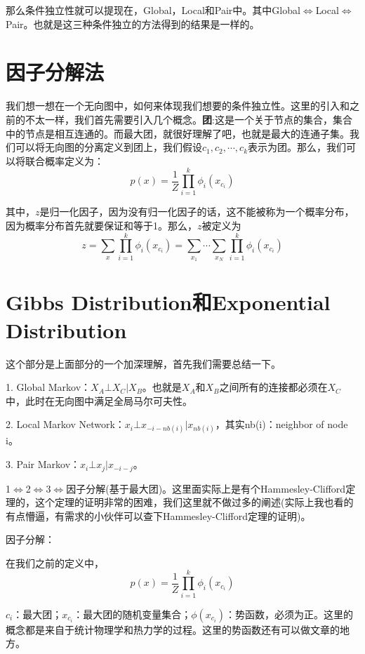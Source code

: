 \documentclass[a4paper]{article}
\begin{document}
那么条件独立性就可以提现在，Global，Local和Pair中。其中Global$\Leftrightarrow$Local$\Leftrightarrow$Pair。也就是这三种条件独立的方法得到的结果是一样的。

\section{因子分解法}
我们想一想在一个无向图中，如何来体现我们想要的条件独立性。这里的引入和之前的不太一样，我们首先需要引入几个概念。\textbf{团}:这是一个关于节点的集合，集合中的节点是相互连通的。而最大团，就很好理解了吧，也就是最大的连通子集。我们可以将无向图的分离定义到团上，我们假设$c_1,c_2,\cdots,c_k$表示为团。那么，我们可以将联合概率定义为：
\begin{equation}
    p(x) = \frac{1}{Z}\prod_{i=1}^k \phi_{i} (x_{c_i})
\end{equation}

其中，$z$是归一化因子，因为没有归一化因子的话，这不能被称为一个概率分布，因为概率分布首先就要保证和等于1。那么，$z$被定义为
\begin{equation}
    z = \sum_x \prod_{i=1}^k\phi_i(x_{c_i}) = \sum_{x_1}\cdots\sum_{x_N} \prod_{i=1}^k\phi_i(x_{c_i})
\end{equation}

\section{Gibbs Distribution和Exponential Distribution}
这个部分是上面部分的一个加深理解，首先我们需要总结一下。

1. Global Markov：$X_A \bot X_C | X_B$。也就是$X_A$和$X_B$之间所有的连接都必须在$X_C$中，此时在无向图中满足全局马尔可夫性。

2. Local Markov Network：$x_i\bot x_{-i-nb(i)}|x_{nb(i)}$，其实nb(i)：neighbor of node i。

3. Pair Markov：$x_i \bot x_j|x_{-i-j}$。

1$\Leftrightarrow$2$\Leftrightarrow$3$\Leftrightarrow$因子分解(基于最大团)。这里面实际上是有个Hammesley-Clifford定理的，这个定理的证明非常的困难，我们这里就不做过多的阐述(实际上我也看的有点懵逼，有需求的小伙伴可以查下Hammesley-Clifford定理的证明)。

\noindent 因子分解：

在我们之前的定义中，
\begin{equation}
    p(x) = \frac{1}{Z}\prod_{i=1}^k \phi_i(x_{c_i})
\end{equation}

$c_i$：最大团；$x_{c_i}$：最大团的随机变量集合；$\phi(x_{c_i})$：势函数，必须为正。这里的概念都是来自于统计物理学和热力学的过程。这里的势函数还有可以做文章的地方。
\end{document}
